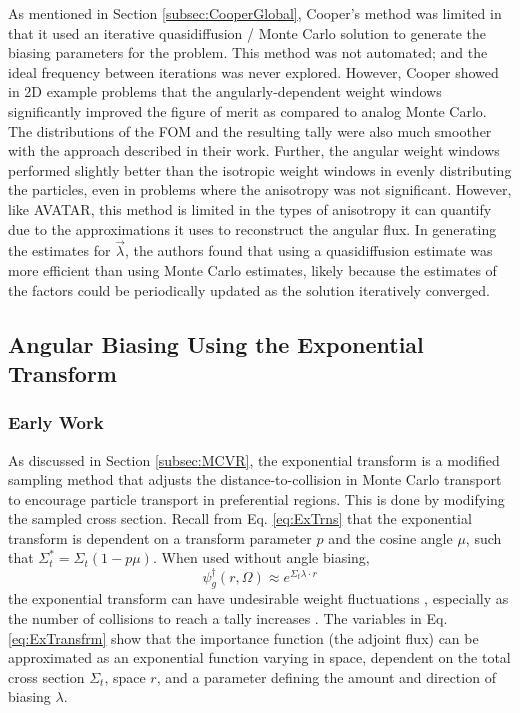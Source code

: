 As mentioned in Section \ref{subsec:CooperGlobal}, Cooper's method was limited in that it used an
iterative quasidiffusion / Monte Carlo solution to generate the biasing parameters for
the problem. This method was not automated; and the ideal frequency between iterations
was never explored. However, Cooper showed in 2D example problems
that the angularly-dependent weight windows
significantly improved the figure of merit as compared to analog Monte Carlo.
The distributions of the FOM and the resulting tally were also much smoother
with the approach described in their work.
Further, the
angular weight windows performed slightly better than the isotropic weight windows in
evenly distributing the particles, even in problems where the anisotropy was not
significant. However, like
AVATAR, this method is limited in the types of anisotropy it can quantify due to
the approximations it uses to reconstruct the angular flux. In generating the
estimates for $\vec{\lambda}$, the authors found that using a quasidiffusion
estimate was more efficient than using Monte Carlo estimates, likely because the
estimates of the factors could be periodically updated as the solution
iteratively converged.
%
%

\subsection{Angular Biasing Using the Exponential Transform}

\subsubsection{Early Work}

As discussed in Section \ref{subsec:MCVR}, the exponential transform is a modified
sampling method that adjusts the distance-to-collision in Monte Carlo
transport to encourage particle transport in preferential regions. This is done
by modifying the sampled cross section.
Recall from Eq. \eqref{eq:ExTrns} that
the exponential transform is dependent on a transform parameter $p$ and the
cosine angle $\mu$, such that $\Sigma_t^* = \Sigma_t(1-p\mu)$.
When used without angle biasing,
\begin{equation}
  \psi^{\dagger}_g (r, \Omega) \approx e^{\Sigma_t \lambda \cdot r}
  \label{eq:ExTransfrm}
\end{equation}
the exponential transform can
have undesirable weight
fluctuations \cite{haghighat_monte_2003}, especially as the number of collisions
to reach a tally increases \cite{gupta_sampling_1985}. The variables in Eq.
\eqref{eq:ExTransfrm} show that the importance function (the adjoint flux) can
be approximated as an exponential function varying in space, dependent on the
total cross section $\Sigma_t$, space $r$, and a parameter defining the amount
and direction of biasing $\lambda$.

